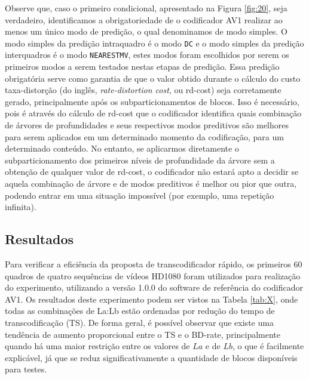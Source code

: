 Observe que, caso o primeiro condicional, apresentado na Figura \ref{fig:20}, seja verdadeiro, identificamos a obrigatoriedade de o codificador AV1 realizar ao menos um único modo de predição, o qual denominamos de modo simples. O modo simples da predição intraquadro é o modo \texttt{DC} e o modo simples da predição interquadros é o  modo \texttt{NEARESTMV}, estes modos foram escolhidos por serem os primeiros modos a serem testados nestas etapas de predição.  Essa predição obrigatória serve como garantia de que o valor obtido durante o cálculo do custo taxa-distorção (do inglês, \textit{rate-distortion cost}, ou rd-cost) seja corretamente gerado, principalmente após os subparticionamentos de blocos. Isso é necessário, pois é através do cálculo de rd-cost que o codificador identifica quais combinação de árvores de profundidades e seus respectivos modos preditivos são melhores para serem aplicados em um determinado momento da codificação, para um determinado conteúdo. No entanto, se aplicarmos diretamente o subparticionamento dos primeiros níveis de profundidade da árvore sem a obtenção de qualquer valor de rd-cost, o codificador não estará apto a decidir se aquela combinação de árvore e de modos preditivos é melhor ou pior que outra, podendo entrar em uma situação impossível (por exemplo, uma repetição infinita).

\subsection{Resultados}
\label{cap:6.1.2}

Para verificar a eficiência da proposta de transcodificador rápido, os primeiros 60 quadros de quatro sequências de vídeos HD1080 foram utilizados para realização do experimento, utilizando a versão 1.0.0 do software de referência do codificador AV1. Os resultados deste experimento podem ser vistos na Tabela \ref{tab:X}, onde todas as combinações de La:Lb estão ordenadas por redução do tempo de transcodificação (TS). De forma geral, é possível observar que existe uma tendência de aumento proporcional entre o TS e o BD-rate, principalmente quando há uma maior restrição entre os valores de $La$ e de $Lb$, o que é facilmente explicável, já que se reduz significativamente a quantidade de blocos disponíveis para testes. 

